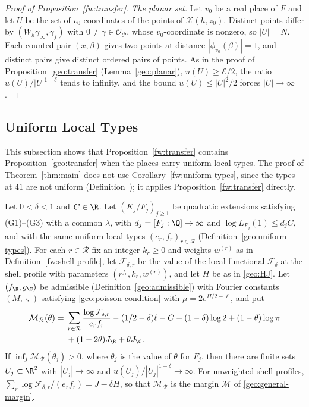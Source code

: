 \begin{proof}[Proof of Proposition~\ref{fw:transfer}]
\emph{The planar set.} Let $v_0$ be a real place of $F$ and let $U$ be
the set of $v_0$-coordinates of the points of $\mathcal X(h,z_0)$.
Distinct points differ by $(W_h\gamma_\infty,\gamma_f)$ with
$0\ne\gamma\in\mathcal O_{\mathcal P}$, whose $v_0$-coordinate is nonzero, so $|U|=N$.
Each counted pair $(x,\beta)$ gives two points at distance
$|\phi_{v_0}(\beta)|=1$, and distinct pairs give distinct ordered
pairs of points. As in the proof of Proposition~\ref{geo:transfer}
(Lemma~\ref{geo:planar}), $u(U)\ge\mathcal E/2$, the ratio
$u(U)/|U|^{1+\delta}$ tends to infinity, and the bound $u(U)\le|U|^2/2$
forces $|U|\to\infty$.
\end{proof}

\subsection{Uniform Local Types}

This subsection shows that Proposition~\ref{fw:transfer} contains
Proposition~\ref{geo:transfer} when the places carry uniform local types. The
proof of Theorem~\ref{thm:main} does not use Corollary~\ref{fw:uniform-types},
since the types at $41$ are not uniform
(Definition~); it applies
Proposition~\ref{fw:transfer} directly.

\begin{corollary}\label{fw:uniform-types}
Let $0<\delta<1$ and $C\in\R$. Let $(K_j/F_j)_{j\ge1}$ be quadratic
extensions satisfying (G1)--(G3) with a common $\lambda$, with
$d_j=[F_j:\Q]\to\infty$ and $\log L_{F_j}(1)\le d_jC$, and with the same
uniform local types $(e_r,f_r)_{r\in\mathcal R}$
(Definition~\ref{geo:uniform-types}). For each $r\in\mathcal R$ fix an
integer $k_r\ge0$ and weights $w^{(r)}$ as in
Definition~\ref{fw:shell-profile}, let $\mathcal F_{\delta,r}$ be the
value of the local functional $\mathcal F_\delta$ at the shell profile
with parameters $(r^{f_r},k_r,w^{(r)})$, and let $H$ be as in
\eqref{geo:HJ}. Let $(f_\R,g_\C)$ be admissible (Definition~\ref{geo:admissible}) with Fourier constants
$(M,\varsigma)$ satisfying \eqref{geo:poisson-condition} with
$\mu=2e^{H/2-\ell}$, and put
\[
 \begin{split}
 \mathcal M_{\mathcal R}(\theta)={}&
 \sum_{r\in\mathcal R}\frac{\log\mathcal F_{\delta,r}}{e_rf_r}
 -(1/2-\delta)\ell-C+(1-\delta)\log2+(1-\theta)\log\pi\\
 &+(1-2\theta)J_\R+\theta J_\C .
 \end{split}
\]
If $\inf_j\mathcal M_{\mathcal R}(\theta_j)>0$, where $\theta_j$ is the
value of $\theta$ for $F_j$, then there are finite sets
$U_j\subset\R^2$ with $|U_j|\to\infty$ and
$u(U_j)/|U_j|^{1+\delta}\to\infty$. For unweighted shell profiles,
$\sum_r\log\mathcal F_{\delta,r}/(e_rf_r)=J-\delta H$, so that
$\mathcal M_{\mathcal R}$ is the margin $\mathcal M$ of
\eqref{geo:general-margin}.
\end{corollary}

